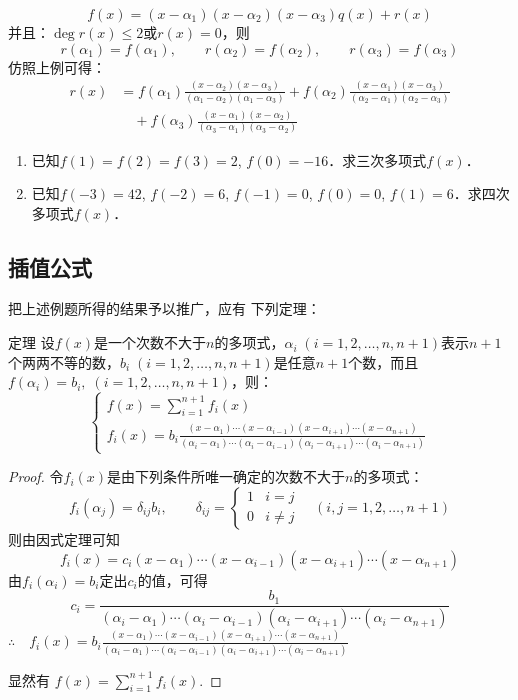 \begin{solution}
\[f(x)=(x-\alpha_1)(x-\alpha_2)(x-\alpha_3)q(x)+r(x)\]
并且：$\deg r(x)\le 2$或$r(x)=0$，则
\[r(\alpha_1)=f(\alpha_1),\qquad r(\alpha_2)=f(\alpha_2),\qquad r(\alpha_3)=f(\alpha_3)\]
 仿照上例可得：
 \[\begin{split}
     r(x)&=f(\alpha_1)\frac{(x-\alpha_2)(x-\alpha_3)}{(\alpha_1-\alpha_2)(\alpha_1-\alpha_3)} +f(\alpha_2)\frac{(x-\alpha_1)(x-\alpha_3)}{(\alpha_2-\alpha_1)(\alpha_2-\alpha_3)}
     \\
&\quad     +f(\alpha_3)\frac{(x-\alpha_1)(x-\alpha_2)}{(\alpha_3-\alpha_1)(\alpha_3-\alpha_2)}
 \end{split}\]
\end{solution}

\begin{ex}
\begin{enumerate}
    \item 已知$f(1)=f(2)=f(3)=2$, $f(0)=-16$．求三次多项式$f(x)$．
    \item 已知$f(-3)=42$, $f(-2)=6$, $f(-1)=0$, $f(0)=0$, $f(1)=6$．求四次多项式$f(x)$．
\end{enumerate} 
\end{ex}

\subsection{插值公式}

把上述例题所得的结果予以推广，应有
下列定理：

\begin{blk}{定理}
    设$f(x)$是一个次数不大于$n$的多项式，$\alpha_i\; (i=1, 2,\ldots,n,n+1)$表示$n+1$个两两不等的数，$b_i\; (i=1, 2,\ldots,n,n+1)$是任意$n+1$个数，而且
$f (\alpha_i) =b_i,\; (i=1, 2,\ldots,n,n+1)$，则：
\[\begin{cases}
   f(x)=\sum^{n+1}_{i=1} f_i(x)\\
   f_i(x)=b_i\frac{(x-\alpha_1)\cdots(x-\alpha_{i-1})(x-\alpha_{i+1})\cdots (x-\alpha_{n+1})}{(\alpha_i-\alpha_1)\cdots(\alpha_i-\alpha_{i-1})(\alpha_i-\alpha_{i+1})\cdots (\alpha_i-\alpha_{n+1})}
\end{cases}\]
\end{blk}

\begin{proof}
令$f_i(x)$是由下列条件所唯一确定的次数不大于$n$的多项式：
\[f_i(\alpha_j)=\delta_{ij}b_i,\qquad \delta_{ij}=\begin{cases}
    1&i=j\\
    0&i\ne j
\end{cases}\quad (i,j=1,2,\ldots,n+1)\]
则由因式定理可知
\[f_i(x)=c_i(x-\alpha_1)\cdots(x-\alpha_{i-1})(x-\alpha_{i+1})\cdots (x-\alpha_{n+1})\]
由$f_i(\alpha_i)=b_i$定出$c_i$的值，可得
\[c_i=\frac{b_1}{(\alpha_i-\alpha_1)\cdots(\alpha_i-\alpha_{i-1})(\alpha_i-\alpha_{i+1})\cdots (\alpha_i-\alpha_{n+1})}\]
$\therefore\quad f_i(x)=b_i\frac{(x-\alpha_1)\cdots(x-\alpha_{i-1})(x-\alpha_{i+1})\cdots (x-\alpha_{n+1})}{(\alpha_i-\alpha_1)\cdots(\alpha_i-\alpha_{i-1})(\alpha_i-\alpha_{i+1})\cdots (\alpha_i-\alpha_{n+1})}$

显然有 $f(x)=\displaystyle\sum^{n+1}_{i=1} f_i(x)$.
\end{proof}


